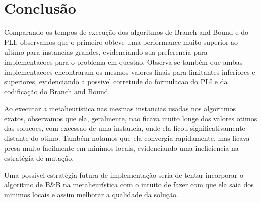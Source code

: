 \documentclass[a4paper,11pt]{article}
\begin{document}
\section{Conclusão}
Comparando os tempos de execução dos algoritmos de Branch and Bound e do PLI, observamos que o primeiro obteve uma performance muito superior ao ultimo para instancias grandes, evidenciando sua preferencia para implementacoes para o problema em questao. Observa-se também que ambas implementacoes encontraram os mesmos valores finais para limitantes inferiores e superiores, evidenciando a possivel corretude da formulacao do PLI e da codificação do Branch and Bound.

Ao executar a metaheurística nas mesmas instancias usadas nos algoritmos exatos, observamos que ela, geralmente, nao ficava muito longe dos valores otimos das solucoes, com excessao de uma instancia, onde ela ficou significativamente distante do otimo. Também notamos que ela convergia rapidamente, mas ficava presa muito facilmente em minimos locais, evidenciando uma ineficiencia na estratégia de mutação.

Uma possivel estratégia futura de implementação seria de tentar incorporar o algoritmo de B\&B na metaheurística com o intuito de fazer com que ela saia dos minimos locais e assim melhorar a qualidade da solução.
\end{document}
